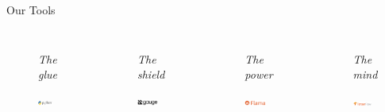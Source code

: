 \begin{frame}{Our Tools}
    \begin{columns}[t]
        \begin{figure}
            \centering
            \Huge{\textit{The glue}}\par\medskip
            \includegraphics[width=0.75\textwidth]{img/python-logo.png}
        \end{figure}

        \qquad
        \pause

        \begin{figure}
            \centering
            \Huge{\textit{The shield}}\par\medskip
            \includegraphics[width=0.75\textwidth]{img/gauge-logo.png}
        \end{figure}

        \pause

        \begin{figure}
            \centering
            \Huge{\textit{The power}}\par\medskip
            \includegraphics[width=0.75\textwidth]{img/flama.png}
        \end{figure}

        \qquad\medskip
        \pause

        \begin{figure}
            \centering
            \Huge{\textit{The mind}}\par\medskip
            \includegraphics[width=0.75\textwidth]{img/tensorflow-logo.png}
        \end{figure}
    \end{columns}
\end{frame}
